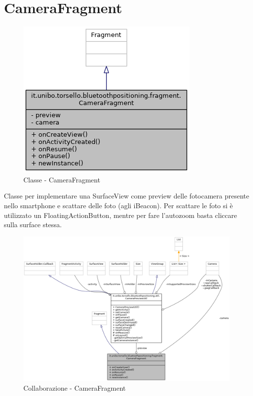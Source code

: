 \section{CameraFragment}
\begin{figure}[ph]
	\centering
	\includegraphics[width=0.5\linewidth]{img/uml/class/classit_1_1unibo_1_1torsello_1_1bluetoothpositioning_1_1fragment_1_1CameraFragment__inherit__graph.png}
	\caption{Classe - CameraFragment}
\end{figure}

Classe per implementare una SurfaceView come preview delle fotocamera presente nello smartphone e scattare delle foto (agli iBeacon). Per scattare le foto si è utilizzato un FloatingActionButton, mentre per fare l'autozoom basta cliccare sulla surface stessa.

\begin{figure}[ph]
	\centering
	\includegraphics[width=1.7\linewidth, angle=90]{img/uml/class/classit_1_1unibo_1_1torsello_1_1bluetoothpositioning_1_1fragment_1_1CameraFragment__coll__graph.png}
	\caption{Collaborazione - CameraFragment}
\end{figure}

